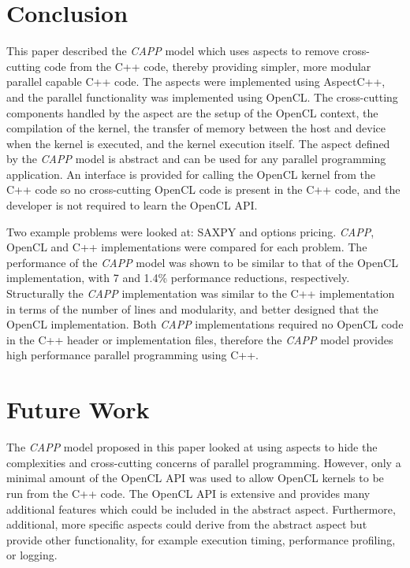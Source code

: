 \documentclass{sig-alternate-05-2015}
\begin{document}
\section{Conclusion}\label{sec:conclusion}

This paper described the \textit{CAPP} model which uses aspects to remove
cross-cutting code from the C++ code, thereby providing simpler, more modular
parallel capable C++ code. The aspects were implemented using AspectC++,
and the parallel functionality was implemented using OpenCL. The cross-cutting 
components handled by the aspect are the setup of the OpenCL
context, the compilation of the kernel, the transfer of memory between the 
host and device when the kernel is executed, and the kernel execution itself. 
The aspect defined by the \textit{CAPP} model is abstract and can be used for 
any parallel programming application. An interface is provided for calling the 
OpenCL kernel from the C++ code so no cross-cutting OpenCL code is present in
the C++ code, and the developer is not required to learn the OpenCL API.

Two example problems were looked at: SAXPY and options pricing. \textit{CAPP}, OpenCL 
and C++ implementations were compared for each problem. The performance of the 
\textit{CAPP} model was shown to be similar to that of the OpenCL
implementation, with 7 and 1.4\% performance reductions, respectively. Structurally 
the \textit{CAPP} implementation was similar 
to the C++  implementation in terms of the number of lines and modularity, and
better designed that the OpenCL implementation. Both \textit{CAPP} implementations
required no OpenCL code in the C++ header or implementation files, therefore the
\textit{CAPP} model provides high performance parallel programming using C++.

\section{Future Work}\label{sec:future}

The \textit{CAPP} model proposed in this paper looked at using aspects to hide
the complexities and cross-cutting concerns of parallel programming. However, only a
minimal amount of the OpenCL API was used to allow OpenCL kernels to be run from the
C++ code. The OpenCL API is extensive and provides many additional features which 
could be included in the abstract aspect. Furthermore, additional, more specific
aspects could derive from the abstract aspect but provide other functionality, 
for example execution timing, performance profiling, or logging.
\end{document}
